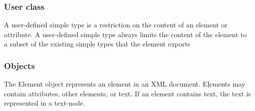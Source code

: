 
\subsubsection{User class}

A user-defined simple type is a restriction on the content of an element or attribute. A user-defined simple type always limits the content of the element to a subset of the existing simple types that the element exports


\subsubsection{Objects}
The Element object represents an element in an XML document. Elements may contain attributes, other elements, or text. If an element contains text, the text is represented in a text-node.


